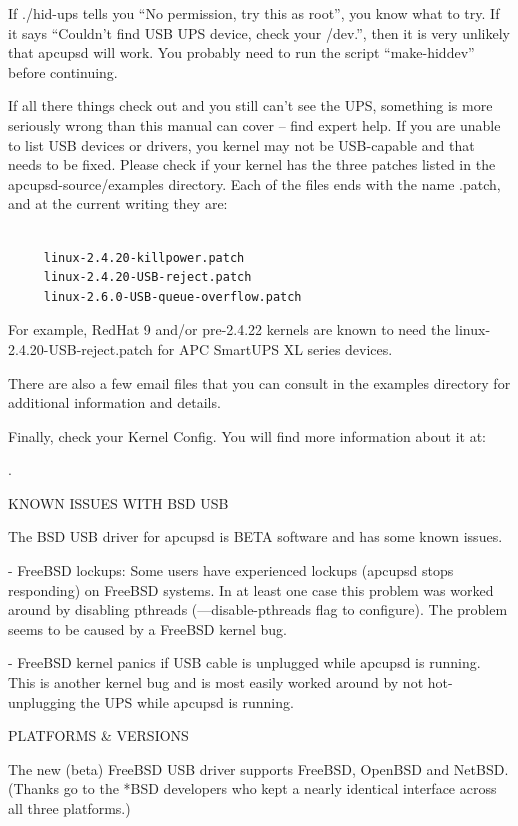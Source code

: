 If ./hid-ups tells you ``No permission, try this as root'', you know what to
try. If it says ``Couldn't find USB UPS device, check your /dev.'', then it is
very unlikely that apcupsd will work.  You probably need to run the script
``make-hiddev'' before continuing.  

If all there things check out and you still can't see the UPS, something is
more seriously wrong than this manual can cover {--} find expert help.  If you
are unable to list USB devices or drivers, you kernel may not be USB-capable
and that needs to be fixed. Please check if your kernel has the three patches
listed in the \lt{}apcupsd-source\gt{}/examples directory. Each of the files
ends with the name .patch, and at the current writing they are: 

\footnotesize
\begin{verbatim}
     
     linux-2.4.20-killpower.patch
     linux-2.4.20-USB-reject.patch
     linux-2.6.0-USB-queue-overflow.patch
\end{verbatim}
\normalsize

For example, RedHat 9 and/or pre-2.4.22 kernels are known to need the
linux-2.4.20-USB-reject.patch for APC SmartUPS XL series devices.  

There are also a few email files that you can consult in the examples
directory for additional information and details.  

Finally, check your Kernel Config. You will find more information about it at:

.  

KNOWN ISSUES WITH BSD USB  

The BSD USB driver for apcupsd is BETA software and has some known issues.  

- FreeBSD lockups: Some users have experienced lockups (apcupsd stops 
responding) on FreeBSD systems. In at least one case this problem was worked 
around by disabling pthreads ({---}disable-pthreads flag to configure). The 
problem seems to be caused by a FreeBSD kernel bug.  

- FreeBSD kernel panics if USB cable is unplugged while apcupsd is running. 
This is another kernel bug and is most easily worked around by not hot- 
unplugging the UPS while apcupsd is running.  

PLATFORMS \& VERSIONS  

The new (beta) FreeBSD USB driver supports FreeBSD, OpenBSD and NetBSD.
(Thanks go to the *BSD developers who kept a nearly identical interface across
all three platforms.)  

